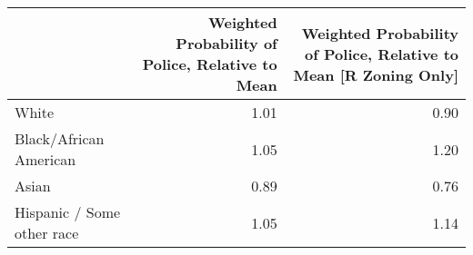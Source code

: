 \begin{tabular}{lrr}
\toprule
{} &  Weighted Probability of Police, Relative to Mean &  Weighted Probability of Police, Relative to Mean [R Zoning Only] \\
\midrule
White                      &                                              1.01 &                                               0.90 \\
Black/African American     &                                              1.05 &                                               1.20 \\
Asian                      &                                              0.89 &                                               0.76 \\
Hispanic / Some other race &                                              1.05 &                                               1.14 \\
\bottomrule
\end{tabular}
